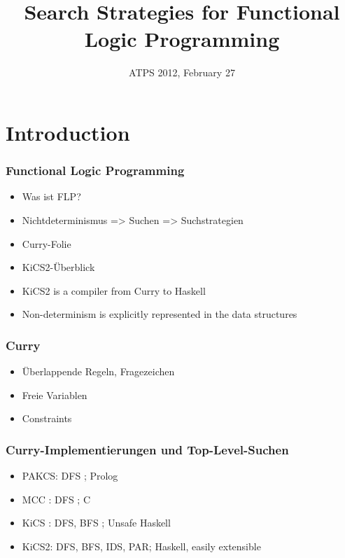 \documentclass[
,hyperref={pdfpagelabels=false}
]{beamer}
\title[Search Strategies for FLP]
{Search Strategies for Functional Logic Programming}
\date[ATPS 2012]{ATPS 2012, February 27}
\author[Hanus, Peemöller, \underline{Reck}]{%
\texorpdfstring
  {Michael Hanus \and Björn Peemöller \and \underline{Fabian Reck}}
  {Michael Hanus \and Björn Peemöller \and Fabian Reck}
}
\institute{Kiel University}
\begin{document}
\begin{frame}%
\titlepage
\end{frame}


\section{Introduction}

\begin{frame}[fragile]%
\frametitle{Functional Logic Programming}
\begin{itemize}
\item Was ist FLP?
\item Nichtdeterminismus => Suchen => Suchstrategien
\item Curry-Folie
\item KiCS2-Überblick
\end{itemize}

\begin{itemize}
\item KiCS2 is a compiler from Curry to Haskell
\item Non-determinism is explicitly represented in
      the data structures
\end{itemize}
\end{frame}

\begin{frame}[fragile]%
\frametitle{Curry}
\begin{itemize}
\item Überlappende Regeln, Fragezeichen
\item Freie Variablen
\item Constraints
\end{itemize}
\end{frame}

\begin{frame}[fragile]%
\frametitle{Curry-Implementierungen und Top-Level-Suchen}
\begin{itemize}
\item PAKCS: DFS               ; Prolog
\item MCC  : DFS               ; C
\item KiCS : DFS, BFS          ; Unsafe Haskell
\item KiCS2: DFS, BFS, IDS, PAR; Haskell, easily extensible
\end{itemize}
\end{frame}
\end{document}

